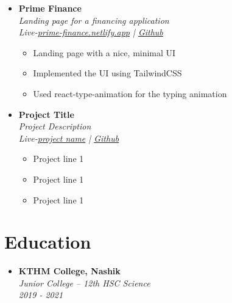 \documentclass[11pt, oneside, a4paper, titlepage]{article}
\begin{document}
\begin{tcolorbox}
\begin{minipage}[t]{11cm}
\begin{tcolorbox}[grow to right by=0.75cm,colframe=white,colback=white]
\begin{itemize}
        \item
        {
          \textbf{Prime Finance} \\
          \textit{Landing page for a financing application} \\
          \textit{Live-\href{https://prime-finance.netlify.app}{prime-finance.netlify.app} | \href{https://github.com/SazedWorldbringer/prime-finance-react}{Github}} \\
          \vspace*{-0.7cm}
          \begin{itemize}
            \item Landing page with a nice, minimal UI
            \item Implemented the UI using TailwindCSS
            \item Used react-type-animation for the typing animation
          \end{itemize}
        }
        \item
        {
          \textbf{Project Title} \\
          \textit{Project Description} \\
          \textit{Live-\href{url}{project name} | \href{https://github.com/SazedWorldbringer}{Github}} \\
          \vspace*{-0.7cm}
          \begin{itemize}
            \item Project line 1
            \item Project line 1
            \item Project line 1
          \end{itemize}
        }
      \end{itemize}
      \section*{Education}
      \begin{itemize}
        \item
        {
          \textbf{KTHM College, Nashik} \\
          \textit{Junior College -- 12th HSC Science} \\
          \textit{2019 - 2021} \\
        }
      \end{itemize}
    \end{tcolorbox}
  \end{minipage}
\end{tcolorbox}
\end{document}
